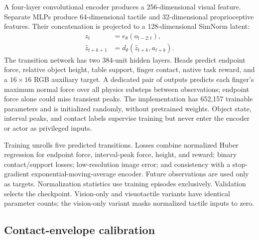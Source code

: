 \documentclass[letterpaper,10pt,conference]{ieeeconf}
\begin{document}
A four-layer convolutional encoder produces a 256-dimensional visual feature.
Separate MLPs produce 64-dimensional tactile and 32-dimensional proprioceptive
features. Their concatenation is projected to a 128-dimensional SimNorm latent:
\begin{equation}
\begin{aligned}
z_t &= e_\theta(o_{t-2:t}),\\
\widehat z_{t+k+1} &= d_\theta(\widehat z_{t+k},a_{t+k}).
\end{aligned}
\label{eq:dynamics}
\end{equation}
The transition network has two 384-unit hidden layers. Heads predict endpoint
force, relative object height, table support, finger contact, native task
reward, and a $16\times16$ RGB auxiliary target. A dedicated pair of outputs
predicts each finger's maximum normal force over all physics substeps between
observations; endpoint force alone could miss transient peaks. The
implementation has 652,157 trainable parameters and is initialized randomly,
without pretrained weights. Object state, interval peaks,
and contact labels supervise training but never enter the encoder or actor as
privileged inputs.

Training unrolls five predicted transitions. Losses combine normalized Huber
regression for endpoint force, interval-peak force, height, and reward;
binary contact/support losses;
low-resolution image error; and consistency with a stop-gradient
exponential-moving-average encoder. Future observations are used only as
targets. Normalization statistics use training episodes exclusively. Validation
selects the checkpoint. Vision-only and visuotactile variants have identical
parameter counts; the vision-only variant masks normalized tactile inputs to
zero.

\subsection{Contact-envelope calibration}
\end{document}
